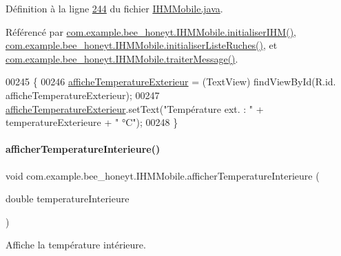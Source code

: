 Définition à la ligne \hyperlink{_i_h_m_mobile_8java_source_l00244}{244} du fichier \hyperlink{_i_h_m_mobile_8java_source}{I\+H\+M\+Mobile.\+java}.



Référencé par \hyperlink{_i_h_m_mobile_8java_source_l00152}{com.\+example.\+bee\+\_\+honeyt.\+I\+H\+M\+Mobile.\+initialiser\+I\+H\+M()}, \hyperlink{_i_h_m_mobile_8java_source_l00170}{com.\+example.\+bee\+\_\+honeyt.\+I\+H\+M\+Mobile.\+initialiser\+Liste\+Ruches()}, et \hyperlink{_i_h_m_mobile_8java_source_l00374}{com.\+example.\+bee\+\_\+honeyt.\+I\+H\+M\+Mobile.\+traiter\+Message()}.


\begin{DoxyCode}
00245     \{
00246         \hyperlink{classcom_1_1example_1_1bee__honeyt_1_1_i_h_m_mobile_a102530688eabbb8bfa549291b51a78ba}{afficheTemperatureExterieur} = (TextView) findViewById(R.id.
      afficheTemperatureExterieur);
00247         \hyperlink{classcom_1_1example_1_1bee__honeyt_1_1_i_h_m_mobile_a102530688eabbb8bfa549291b51a78ba}{afficheTemperatureExterieur}.setText(\textcolor{stringliteral}{"Température ext. : "} + 
      temperatureExterieure + \textcolor{stringliteral}{" °C"});
00248     \}
\end{DoxyCode}
\mbox{\label{classcom_1_1example_1_1bee__honeyt_1_1_i_h_m_mobile_ac0f55897a183a0887c87954f6fbfdf2f}} 
\paragraph{\texorpdfstring{afficher\+Temperature\+Interieure()}{afficherTemperatureInterieure()}}
{\footnotesize\ttfamily void com.\+example.\+bee\+\_\+honeyt.\+I\+H\+M\+Mobile.\+afficher\+Temperature\+Interieure (\begin{DoxyParamCaption}\item[{double}]{temperature\+Interieure }\end{DoxyParamCaption})}



Affiche la température intérieure. 


